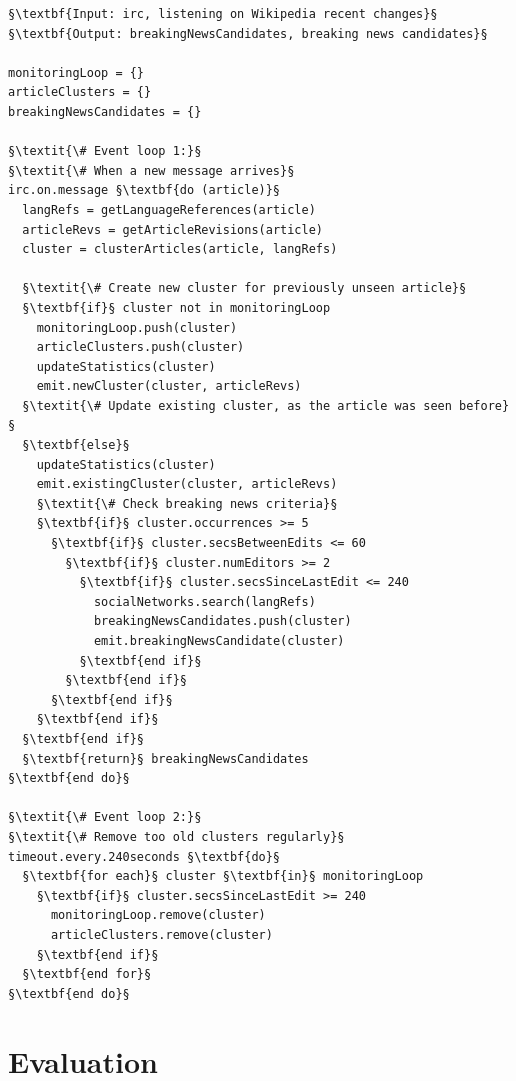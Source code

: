 \begin{lstlisting}[caption=Two main event loops
  of the application, 
  label=code:pseudocode-wikipedia-monitor, escapechar=§]
§\textbf{Input: irc, listening on Wikipedia recent changes}§ 
§\textbf{Output: breakingNewsCandidates, breaking news candidates}§ 

monitoringLoop = {}
articleClusters = {}
breakingNewsCandidates = {}
 
§\textit{\# Event loop 1:}§
§\textit{\# When a new message arrives}§
irc.on.message §\textbf{do (article)}§
  langRefs = getLanguageReferences(article)
  articleRevs = getArticleRevisions(article)
  cluster = clusterArticles(article, langRefs)  
  
  §\textit{\# Create new cluster for previously unseen article}§
  §\textbf{if}§ cluster not in monitoringLoop
    monitoringLoop.push(cluster)
    articleClusters.push(cluster)
    updateStatistics(cluster)
    emit.newCluster(cluster, articleRevs)    
  §\textit{\# Update existing cluster, as the article was seen before}§
  §\textbf{else}§
    updateStatistics(cluster)
    emit.existingCluster(cluster, articleRevs)
    §\textit{\# Check breaking news criteria}§
    §\textbf{if}§ cluster.occurrences >= 5
      §\textbf{if}§ cluster.secsBetweenEdits <= 60      
        §\textbf{if}§ cluster.numEditors >= 2
          §\textbf{if}§ cluster.secsSinceLastEdit <= 240
            socialNetworks.search(langRefs)
            breakingNewsCandidates.push(cluster)
            emit.breakingNewsCandidate(cluster)            
          §\textbf{end if}§          
        §\textbf{end if}§  
      §\textbf{end if}§        
    §\textbf{end if}§          
  §\textbf{end if}§
  §\textbf{return}§ breakingNewsCandidates
§\textbf{end do}§

§\textit{\# Event loop 2:}§
§\textit{\# Remove too old clusters regularly}§
timeout.every.240seconds §\textbf{do}§
  §\textbf{for each}§ cluster §\textbf{in}§ monitoringLoop
    §\textbf{if}§ cluster.secsSinceLastEdit >= 240
      monitoringLoop.remove(cluster)
      articleClusters.remove(cluster)
    §\textbf{end if}§
  §\textbf{end for}§ 
§\textbf{end do}§
\end{lstlisting}

\section{Evaluation}
\label{sec:premature-evaluation}

